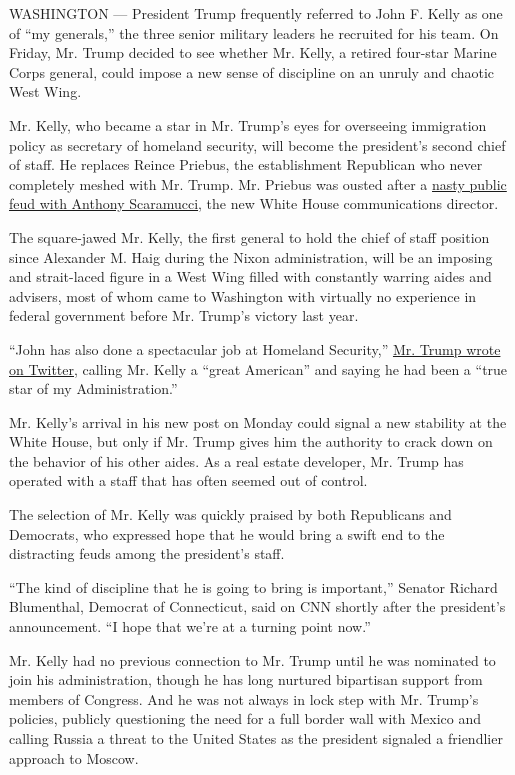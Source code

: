 WASHINGTON --- President Trump frequently referred to John F. Kelly as
one of ``my generals,'' the three senior military leaders he recruited
for his team. On Friday, Mr. Trump decided to see whether Mr. Kelly, a
retired four-star Marine Corps general, could impose a new sense of
discipline on an unruly and chaotic West Wing.

Mr. Kelly, who became a star in Mr. Trump's eyes for overseeing
immigration policy as secretary of homeland security, will become the
president's second chief of staff. He replaces Reince Priebus, the
establishment Republican who never completely meshed with Mr. Trump. Mr.
Priebus was ousted after a
\href{https://www.nytimes.com/2017/07/27/us/politics/scaramucci\%2Dpriebus\%2Dleaks.html?_r=0}{nasty
public feud with Anthony Scaramucci}, the new White House communications
director.

The square-jawed Mr. Kelly, the first general to hold the chief of staff
position since Alexander M. Haig during the Nixon administration, will
be an imposing and strait-laced figure in a West Wing filled with
constantly warring aides and advisers, most of whom came to Washington
with virtually no experience in federal government before Mr. Trump's
victory last year.

``John has also done a spectacular job at Homeland Security,''
\href{https://twitter.com/realDonaldTrump/status/891039237319143424}{Mr.
Trump wrote on Twitter}, calling Mr. Kelly a ``great American'' and
saying he had been a ``true star of my Administration.''

Mr. Kelly's arrival in his new post on Monday could signal a new
stability at the White House, but only if Mr. Trump gives him the
authority to crack down on the behavior of his other aides. As a real
estate developer, Mr. Trump has operated with a staff that has often
seemed out of control.

The selection of Mr. Kelly was quickly praised by both Republicans and
Democrats, who expressed hope that he would bring a swift end to the
distracting feuds among the president's staff.

``The kind of discipline that he is going to bring is important,''
Senator Richard Blumenthal, Democrat of Connecticut, said on CNN shortly
after the president's announcement. ``I hope that we're at a turning
point now.''

Mr. Kelly had no previous connection to Mr. Trump until he was nominated
to join his administration, though he has long nurtured bipartisan
support from members of Congress. And he was not always in lock step
with Mr. Trump's policies, publicly questioning the need for a full
border wall with Mexico and calling Russia a threat to the United States
as the president signaled a friendlier approach to Moscow.


